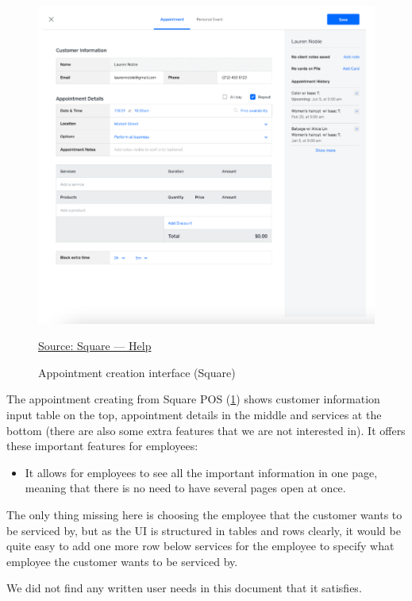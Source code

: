 \documentclass[]{VUMIFTemplateClass}
\begin{document}
\begin{figure}[H]
    \centering
    \includegraphics[width=\textwidth]{images/examples/appointment_creating_square.png}
    \caption{Appointment creation interface (Square)}
    \href{https://squareup.com/help/us/en}{Source: Square — Help}
    \label{fig:appointment-creation}
\end{figure}

The appointment creating from Square POS (\ref{fig:appointment-creation}) shows
customer information input table on the top, appointment details in the middle
and services at the bottom (there are also some extra features that we are not
interested in). It offers these important features for employees:

\begin{itemize}
    \item It allows for employees to see all the important information in one page, meaning that there is no need to have several pages open at once.
\end{itemize}

The only thing missing here is choosing the employee that the customer wants to be serviced by, but as the UI is structured in tables and rows clearly, it would be quite easy to add one more row below services for the employee to specify what employee the customer wants to be serviced by. 

We did not find any written user needs in this document that it satisfies.
\end{document}
